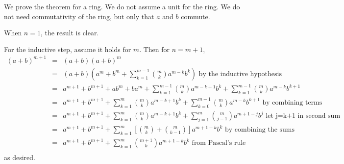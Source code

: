 \documentclass[12pt]{article}
\begin{document}
We prove the theorem for a ring. We do not assume a unit for the ring.
We do not need commutativity of the ring, but only that $a$ and $b$ commute.

When $n=1$, the result is clear.

For the inductive step, assume it holds for $m$. Then for $n = m+1$,
\begin{eqnarray*}
(a+b)^{m+1} & = & (a+b)(a+b)^m  \\
& = & (a+b)(a^m + b^m+ \sum_{k=1}^{m-1} \binom{m}{k} a^{m-k} b^k )\text{ by the inductive hypothesis} \\
& = & a^{m+1} + b^{m+1} + ab^m + ba^m + \sum_{k=1}^{m-1} \binom{m}{k} a^{m-k+1} b^k + \sum_{k=1}^{m-1} \binom{m}{k} a^{m-k} b^{k+1} \\ 
& = & a^{m+1} + b^{m+1} + \sum_{k=1}^m \binom{m}{k} a^{m-k+1} b^k + \sum_{k=0}^{m-1} \binom{m}{k} a^{m-k} b^{k+1} \text{ by combining terms} \\
& = & a^{m+1} + b^{m+1} + \sum_{k=1}^m \binom{m}{k} a^{m-k+1} b^k + \sum_{j=1}^m \binom{m}{j-1} a^{m+1-j} b^j \text{ let j=k+1 in second sum} \\
& = & a^{m+1} + b^{m+1} + \sum_{k=1}^m \left[ \binom{m}{k} + \binom{m}{k-1} \right] a^{m+1-k}b^k \text{ by combining the sums}\\
& = & a^{m+1} + b^{m+1} + \sum_{k=1}^m \binom{m+1}{k} a^{m+1-k}b^k \text{ from Pascal's rule} \\
\end{eqnarray*}
as desired.
\end{document}

